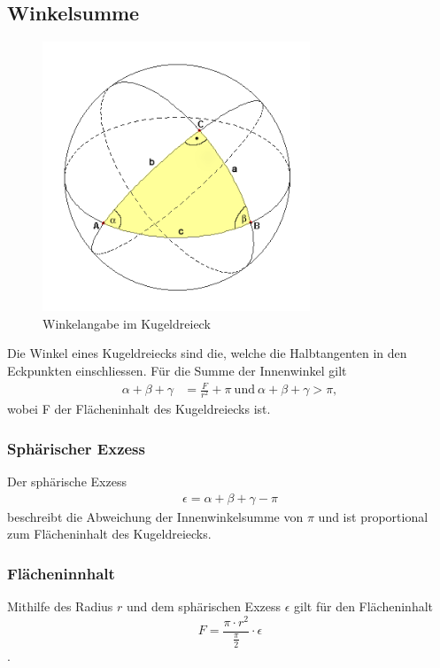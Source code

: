 \subsection{Winkelsumme}
\begin{figure}
	
	\begin{center}
		\includegraphics[width=8cm]{papers/nav/bilder/kugel2.png}
		\caption[Winkelangabe im Kugeldreieck]{Winkelangabe im Kugeldreieck}
	\end{center}	
\end{figure}


Die Winkel eines Kugeldreiecks sind die, welche die Halbtangenten in den Eckpunkten einschliessen. 
Für die Summe der Innenwinkel gilt
\begin{align}
	\alpha+\beta+\gamma &= \frac{F}{r^2} + \pi \ \text{und} \ \alpha+\beta+\gamma > \pi, \nonumber
\end{align}
wobei F der Flächeninhalt des Kugeldreiecks ist.
\subsubsection{Sphärischer Exzess}
Der sphärische Exzess
\begin{align}
	\epsilon = \alpha+\beta+\gamma - \pi \nonumber
\end{align}  
beschreibt die Abweichung der Innenwinkelsumme von $\pi$ und ist proportional zum Flächeninhalt des Kugeldreiecks.

\subsubsection{Flächeninnhalt}
Mithilfe des Radius $r$ und dem sphärischen Exzess $\epsilon$ gilt für den Flächeninhalt 
\[ F=\frac{\pi \cdot r^2}{\frac{\pi}{2}} \cdot \epsilon\].
